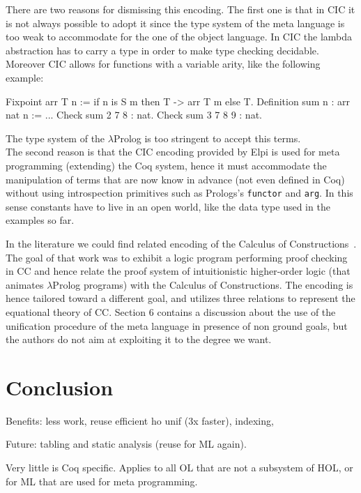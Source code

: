 \documentclass[sigconf,natbib=false,review]{acmart}
\begin{document}
\noindent
There are two reasons for dismissing this encoding. The first one is that
in CIC it is not always possible to adopt it since the type system
of the meta language is too weak to accommodate for the one of the 
object language. In CIC the lambda abstraction has to carry a type in order to
make type checking decidable. Moreover CIC allows for functions with a
variable arity, like the following example:

\begin{coqcode}
Fixpoint arr T n := if n is S m then T -> arr T m else T.
Definition sum n : arr nat n := ...
Check sum 2   7 8   : nat.
Check sum 3   7 8 9 : nat.
\end{coqcode}

\noindent
The type system of the $\lambda$Prolog is too stringent to accept this terms.\\
The second reason is that the CIC encoding provided by Elpi is used for meta
programming (extending) the Coq system, hence it must accommodate the
manipulation of terms that are now know in advance (not even defined in Coq)
without using introspection primitives such as Prologs's \texttt{functor}
and \texttt{arg}. In this sense constants have to live in an open world, like
the  data type used in the examples so far.

In the literature we could find related encoding of the Calculus of
Constructions~\cite{felty93lics}. The goal of that work was to exhibit
a logic program performing proof checking in CC and hence relate the
proof system of intuitionistic higher-order logic (that animates $\lambda$Prolog
programs) with the Calculus of Constructions. The encoding is hence tailored
toward a different goal, and utilizes three relations to represent the
equational theory of CC. Section 6 contains a discussion about the use of the
unification procedure of the meta language in presence of non ground goals, but
the authors do not aim at exploiting it to the degree we want.


\section{Conclusion}

Benefits: less work, reuse efficient ho unif (3x faster), indexing,

Future: tabling and static analysis (reuse for ML again).

Very little is Coq specific. Applies to all OL that are not a subsystem of 
HOL, or for ML that are used for meta programming.

\printbibliography

\clearpage


\end{document}
